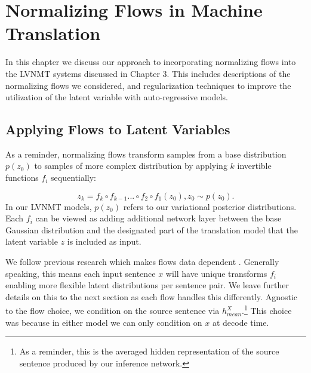 \chapter{Normalizing Flows in Machine Translation}


In this chapter we discuss our approach to incorporating normalizing flows into the \ac{LVNMT} systems discussed in Chapter 3. This includes descriptions of the normalizing flows we considered, and regularization techniques to improve the utilization of the latent variable with auto-regressive models.
\section{Applying Flows to Latent Variables}


As a reminder, normalizing flows transform samples from a base distribution $p(z_{0})$ to samples of more complex distribution by applying $k$ invertible functions $f_{i}$ sequentially: 

\begin{equation}
z_{k} = f_{k} \circ f_{k-1} ... \circ f_{2} \circ f_{1}(z_{0}) , z_{0} \sim p(z_{0}).
\end{equation}
In our \ac{LVNMT} models, $p(z_{0})$ refers to our variational posterior distributions. Each $f_{i}$ can be viewed as adding additional network layer between the base Gaussian distribution and the designated part of the translation model that the latent variable $z$ is included as input.

We follow previous research which makes flows data dependent \cite{rezende2015VIwithNF,Berg2018SylvesterNF,kingma2016IAF,tomczak2016Householder}.  Generally speaking, this means each input sentence $x$ will have unique transforms $f_{i}$ enabling more flexible latent distributions per sentence pair. We leave further details on this to the next section as each flow handles this differently. Agnostic to the flow choice, we condition on the source sentence via $h_{mean}^{X}$.\footnote{As a reminder, this is the averaged hidden representation of the source sentence produced by our inference network.} This choice was because in either model we can only condition on $x$ at decode time.

